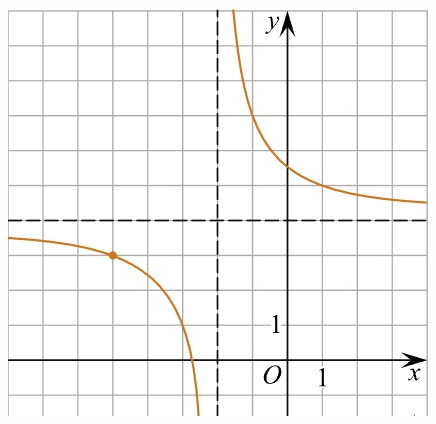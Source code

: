 \begin{class}[number=6]
\begin{listofex}
\begin{minipage}[t]{\picwidth}
			\includegraphics[align=t, width=\linewidth]{../pics/G101M4C6-5.jpg}
		\end{minipage}

\end{listofex}
\end{class}
